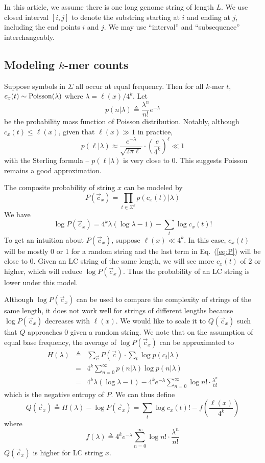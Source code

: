 \documentclass[webpdf,contemporary,large,namedate]{oup-authoring-template}%
\begin{document}
In this article, we assume there is one long genome string of length $L$.
We use closed interval $[i,j]$ to denote the substring starting at $i$
and ending at $j$, including the end points $i$ and $j$.
We may use ``interval'' and ``subsequence'' interchangeably.

\subsection{Modeling $k$-mer counts}

Suppose symbols in $\Sigma$ all occur at equal frequency.
Then for all $k$-mer $t$, $c_x(t)\sim{\rm Poisson}(\lambda)$ where $\lambda=\ell(x)/4^k$.
Let
$$
p(n|\lambda)\triangleq\frac{\lambda^n}{n!}e^{-\lambda}
$$
be the probability mass function of Poisson distribution.
Notably, although $c_x(t)\le\ell(x)$, given that $\ell(x)\gg1$ in practice,
$$
p(\ell|\lambda)\approx\frac{e^{-\lambda}}{\sqrt{2\pi\ell}}\cdot\left(\frac{e}{4^k}\right)^{\ell}\ll 1
$$
with the Sterling formula -- $p(\ell|\lambda)$ is very close to 0.
This suggests Poisson remains a good approximation.

The composite probability of string $x$ can be modeled by
$$
P(\vec{c}_x)=\prod_{t\in\Sigma^k}p(c_x(t)|\lambda)
$$
We have
\begin{equation}\label{eq:P}
\log P(\vec{c}_x)=4^k\lambda(\log\lambda-1)-\sum_t\log c_x(t)!
\end{equation}
To get an intuition about $P(\vec{c}_x)$, suppose $\ell(x)\ll4^k$.
In this case, $c_x(t)$ will be mostly 0 or 1 for a random string
and the last term in Eq.~(\ref{eq:P}) will be close to 0.
Given an LC string of the same length,
we will see more $c_x(t)$ of 2 or higher, which will reduce $\log P(\vec{c}_x)$.
Thus the probability of an LC string is lower under this model.

Although $\log P(\vec{c}_x)$ can be used to compare the complexity of strings of the same length,
it does not work well for strings of different lengths because $\log P(\vec{c}_x)$ decreases with $\ell(x)$.
We would like to scale it to $Q(\vec{c}_x)$ such that
$Q$ approaches 0 given a random string.
We note that on the assumption of equal base frequency,
the average of $\log P(\vec{c}_x)$ can be approximated to
\begin{eqnarray*}
H(\lambda)&\triangleq&\sum_{\vec{c}}P(\vec{c})\cdot\sum_t\log p(c_t|\lambda)\\
&=&4^k\sum_{n=0}^{\infty}p(n|\lambda)\log p(n|\lambda)\\
&=&4^k\lambda(\log\lambda-1)-4^ke^{-\lambda}\sum_{n=0}^{\infty}\log n!\cdot\frac{\lambda^n}{n!}
\end{eqnarray*}
which is the negative entropy of $P$.
We can thus define
$$
Q(\vec{c}_x)\triangleq H(\lambda)-\log P(\vec{c}_x)=\sum_t\log c_x(t)!-f\left(\frac{\ell(x)}{4^k}\right)
$$
where
$$
f(\lambda)\triangleq4^ke^{-\lambda}\sum_{n=0}^\infty\log n!\cdot\frac{\lambda^n}{n!}
$$
$Q(\vec{c}_x)$ is higher for LC string $x$.
\end{document}
